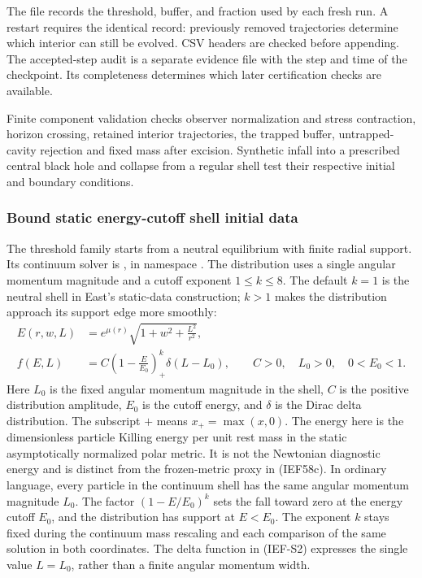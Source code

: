 The file  records the threshold, buffer, and
fraction used by each fresh run. A restart requires the identical record:
previously removed trajectories determine which interior can still be
evolved. CSV headers are checked before appending. The accepted-step audit
is a separate evidence file with the step and time of the checkpoint.
Its completeness determines which later certification checks are available.

Finite component validation checks observer normalization and stress
contraction, horizon crossing, retained interior trajectories, the trapped
buffer, untrapped-cavity rejection and fixed mass after excision. Synthetic
infall into a prescribed central black hole and collapse from a regular
shell test their respective initial and boundary conditions.

\subsubsection{Bound static energy-cutoff shell initial data}
\label{sec:ef-static-energy-cutoff-shell}

The threshold family starts from a neutral equilibrium with finite radial
support.  Its continuum solver is
, in namespace
.  The distribution uses a single angular momentum magnitude and a cutoff
exponent \(1\le k\le8\). The default \(k=1\) is the neutral shell in
East's static-data construction; \(k>1\) makes the distribution approach
its support edge more smoothly:
\begin{align}
 E(r,w,L)&=e^{\mu(r)}
   \sqrt{1+w^2+\frac{L^2}{r^2}},                    \tag{IEF-S1}\\
 f(E,L)&=C\left(1-\frac{E}{E_0}\right)_+^k
                  \delta(L-L_0),
 \qquad C>0,\quad L_0>0,\quad0<E_0<1.               \tag{IEF-S2}
\end{align}
Here \(L_0\) is the fixed angular momentum magnitude in the shell, \(C\) is the positive
distribution amplitude, \(E_0\) is the cutoff energy, and \(\delta\) is the
Dirac delta distribution.  The subscript \(+\) means
\(x_+=\max(x,0)\).  The energy here is the
dimensionless particle Killing energy per unit rest mass in the static
asymptotically normalized polar metric.  It is not the Newtonian diagnostic
energy and is distinct from the frozen-metric proxy in (IEF58c).
In ordinary language, every particle in the continuum shell has the same
angular momentum magnitude \(L_0\). The factor \((1-E/E_0)^k\)
sets the fall toward zero at the energy cutoff \(E_0\), and the distribution
has support at \(E<E_0\). The exponent \(k\) stays fixed during the
continuum mass rescaling and each comparison of the same solution in both coordinates.  The delta function in
(IEF-S2) expresses the single value \(L=L_0\), rather than a finite
angular momentum width.

